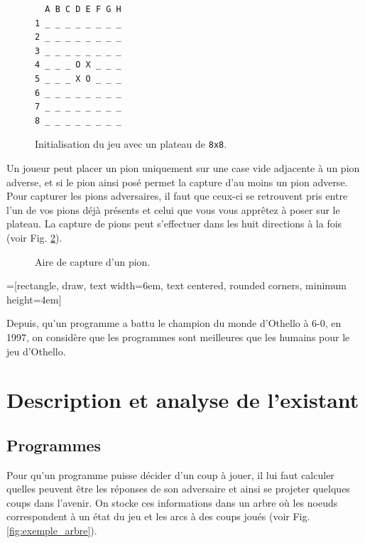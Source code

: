 \documentclass[10pt,a4paper]{article}
\begin{document}
\begin{figure}[H]    
\centering
\begin{BVerbatim}
  A B C D E F G H
1 _ _ _ _ _ _ _ _
2 _ _ _ _ _ _ _ _
3 _ _ _ _ _ _ _ _
4 _ _ _ O X _ _ _
5 _ _ _ X O _ _ _
6 _ _ _ _ _ _ _ _
7 _ _ _ _ _ _ _ _
8 _ _ _ _ _ _ _ _
\end{BVerbatim}
\caption {Initialisation du jeu avec un plateau de \texttt{8x8}.\label{fig:début_du_jeu}}
\end{figure}
\newpage
Un joueur peut placer un pion uniquement sur une case vide adjacente à un pion adverse, et si le pion ainsi posé permet la capture d'au moins un pion adverse. Pour capturer les pions adversaires, il faut que ceux-ci se retrouvent pris entre l'un de vos pions déjà présents et celui que vous vous apprêtez à poser sur le plateau. La capture de pions peut s'effectuer dans les huit directions à la fois (voir Fig. \ref{fig:aire_de_capture}).

\begin{figure}[H]    
\centering
{}
\caption {Aire de capture d'un pion.\label{fig:aire_de_capture}}
\end{figure}
=[rectangle, draw, text width=6em, text centered, rounded corners, minimum height=4em]

Depuis, qu'un programme a battu le champion du monde d'Othello à 6-0, en 1997\cite{CK06}, on considère que les programmes sont meilleures que les humains pour le jeu d'Othello.

\section{Description et analyse de l'existant}

\subsection{Programmes}
\label{sec:programmes}
Pour qu'un programme puisse décider d'un coup à jouer, il lui faut calculer quelles peuvent être les réponses de son adversaire et ainsi se projeter quelques coups dans l'avenir. On stocke ces informations dans un arbre où les noeuds correspondent à un état du jeu et les arcs à des coups joués (voir Fig. \ref{fig:exemple_arbre}).\\
\end{document}
